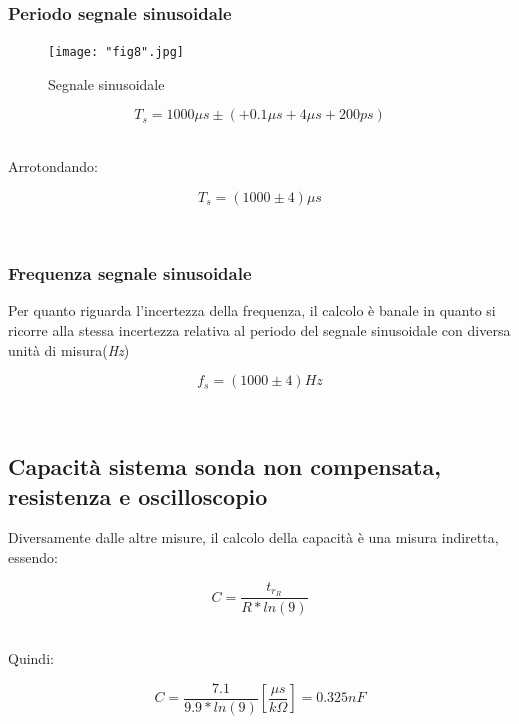 \documentclass[a4paper]{article}
\begin{document}
\subsubsection{Periodo segnale sinusoidale}
\begin{figure}[htp]
	\centering
	\texttt{[image: "fig8".jpg]}
	\caption{Segnale sinusoidale }
	\label{}
\end{figure}
\begin{Large}
	\begin{equation}
  		{T_s}= 1000\mu s\pm (+ 0.1 \mu s + 4 \mu s + 200ps)
	\end{equation}
\end{Large}\\
Arrotondando: 

\begin{Large}
	\begin{equation}
		{T_s}= (1000 \pm 4)\mu s 
	\end{equation}
\end{Large}\\


\subsubsection{Frequenza segnale sinusoidale}
Per quanto riguarda l'incertezza della frequenza, il calcolo è banale in quanto si ricorre alla stessa incertezza relativa al periodo del segnale sinusoidale con diversa unità di misura(\emph{Hz})
\begin{Large}
	\begin{equation}
  		{f_s}= (1000\pm 4)Hz
	\end{equation}
\end{Large}\\

\subsection{Capacità sistema sonda non compensata, resistenza e oscilloscopio}
Diversamente dalle altre misure, il calcolo della capacità è una misura indiretta, essendo: 
\begin{Large}
	\begin{equation}
  		C= \frac{t_{r_R}}{R*ln(9)}
	\end{equation}
\end{Large}\\

Quindi:
\begin{Large}
	\begin{equation}
  		C= \frac{7.1}{9.9*ln(9)} [\frac{\mu s}{k\Omega}]= 0.325nF
	\end{equation}
\end{Large}\\
\end{document}
